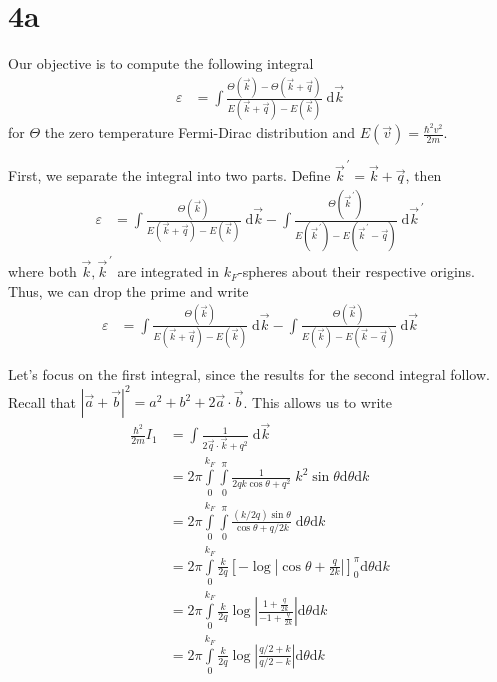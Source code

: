 \documentclass[12pt]{article}
\newcommand{\abs}[1]{\left|#1\right|}
\newcommand{\pvec}[1]{\vec{#1}^{\,\prime}}
\begin{document}
\onehalfspacing

\pagestyle{fancy}
\cfoot{\thepage/\pageref{LastPage}}

\section{4a}

Our objective is to compute the following integral
\begin{align}
    \varepsilon &= \int \frac{\Theta(\vec{k}) - \Theta(\vec{k} + \vec{q})}
    {E(\vec{k} + \vec{q}) - E(\vec{k})}\;\mathrm{d}\vec{k}
\end{align}
for $\Theta$ the zero temperature Fermi-Dirac distribution and
$E(\vec{v}) = \frac{\hbar^2 v^2}{2m}$.

First, we separate the integral into two parts. Define $\pvec{k} = \vec{k} +
\vec{q}$, then
\begin{align}
    \varepsilon &= \int \frac{\Theta(\vec{k})}{E\left( \vec{k} + \vec{q} \right) -
    E\left( \vec{k} \right)}\;\mathrm{d}\vec{k} -
    \int \frac{\Theta(\pvec{k})}{E\left( \pvec{k} \right) - E\left( \pvec{k} -
    \vec{q} \right)}\;\mathrm{d}\pvec{k}
\end{align}
where both $\vec{k}, \pvec{k}$ are integrated in $k_F$-spheres about their
respective origins. Thus, we can drop the prime and write
\begin{align}
    \varepsilon &= \int \frac{\Theta(\vec{k})}{E\left( \vec{k} + \vec{q} \right) -
    E\left( \vec{k} \right)}\;\mathrm{d}\vec{k} -
    \int \frac{\Theta(\vec{k})}{E\left( \vec{k} \right) - E\left( \vec{k} -
    \vec{q} \right)}\;\mathrm{d}\vec{k}
\end{align}

Let's focus on the first integral, since the results for the second integral
follow. Recall that $\abs{ \vec{a} + \vec{b} }^2 = a^2 + b^2 + 2\vec{a}\cdot
\vec{b}$.  This allows us to write
\begin{align}
    \frac{\hbar^2}{2m}I_1 &= \int
        \frac{1}{2\vec{q} \cdot \vec{k} + q^2}\;\mathrm{d}\vec{k}\label{four}\\
    &= 2\pi \int\limits_{0}^{k_F}\int\limits_{0}^{\pi}
        \frac{1}{2qk\cos\theta + q^2}\;k^2\sin\theta
        \mathrm{d}\theta \mathrm{d}k\\
    &= 2\pi \int\limits_{0}^{k_F}\int\limits_{0}^{\pi}
        \frac{(k/2q)\sin\theta}{\cos\theta + q/2k}\;
        \mathrm{d}\theta \mathrm{d}k\\
    &= 2\pi \int\limits_{0}^{k_F}\frac{k}{2q}
        \left[ -\log\left| \cos \theta + \frac{q}{2k} \right| \right]_0^\pi
        \mathrm{d}\theta \mathrm{d}k\\
    &= 2\pi \int\limits_{0}^{k_F}\frac{k}{2q}
        \log \abs{\frac{1 + \frac{q}{2k}}{-1 + \frac{q}{2k}}}
        \mathrm{d}\theta \mathrm{d}k\\
    &= 2\pi \int\limits_{0}^{k_F}\frac{k}{2q}
        \log \abs{\frac{q/2 + k}{q/2 - k}}
        \mathrm{d}\theta \mathrm{d}k\label{nine}
\end{align}
\end{document}

